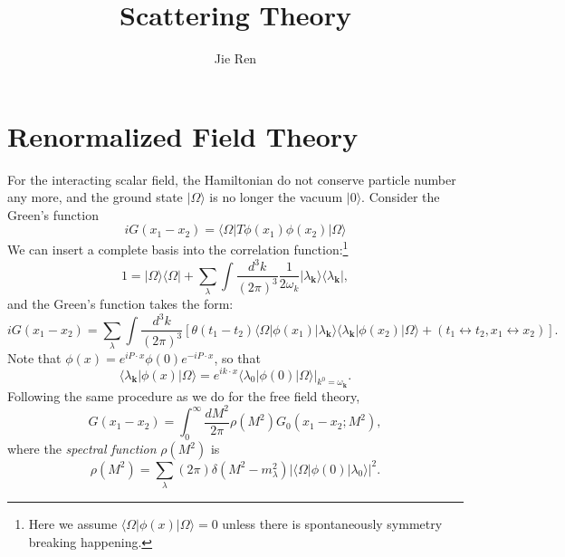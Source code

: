 \documentclass[aps,prb,superscriptaddress,nofootinbib]{revtex4}
\begin{document}
\title{Scattering Theory}
\author{Jie Ren}



\maketitle

\tableofcontents


\section{Renormalized Field Theory}

For the interacting scalar field, the Hamiltonian do not conserve particle number any more, and the ground state $|\Omega\rangle$ is no longer the vacuum $|0\rangle$.
Consider the Green's function
\begin{equation}
	iG(x_1-x_2) = \langle\Omega|T\phi(x_1)\phi(x_2)|\Omega\rangle 
\end{equation}
We can insert a complete basis into the correlation function:\footnote{Here we assume $\langle\Omega|\phi(x)|\Omega\rangle=0$ unless there is spontaneously symmetry breaking happening.}
\begin{equation}
	1 = |\Omega\rangle\langle\Omega| + \sum_\lambda\int\frac{d^3 k}{(2\pi)^3}\frac{1}{2\omega_k}|\lambda_{\bm k}\rangle \langle\lambda_{\bm k}|,
\end{equation}
and the Green's function takes the form:
\begin{equation*}
	iG(x_1-x_2) = \sum_\lambda \int\frac{d^3 k}{(2\pi)^3}
	\left[\theta(t_1-t_2)\langle\Omega|\phi(x_1)|\lambda_{\bm k}\rangle\langle\lambda_{\bm k}|\phi(x_2)|\Omega\rangle + (t_1\leftrightarrow t_2, x_1 \leftrightarrow x_2)\right].
\end{equation*}
Note that $\phi(x)=e^{iP\cdot x}\phi(0) e^{-iP\cdot x}$, so that
\begin{equation}
	\langle\lambda_{\bm k}|\phi(x)|\Omega\rangle 
	= e^{ik\cdot x} \left.\langle\lambda_{0}|\phi(0)|\Omega\rangle\right|_{k^0=\omega_{\bm k}}.
\end{equation}
Following the same procedure as we do for the free field theory, 
\begin{equation}
	G(x_1-x_2) = \int_0^\infty \frac{dM^2}{2\pi} \rho(M^2) G_0(x_1-x_2;M^2),
\end{equation}
where the \textit{spectral function} $\rho(M^2)$ is
\begin{equation}
	\rho(M^2) = \sum_\lambda(2\pi)\delta(M^2-m_\lambda^2)|\langle\Omega|\phi(0)|\lambda_0\rangle|^2.
\end{equation}
\end{document}
